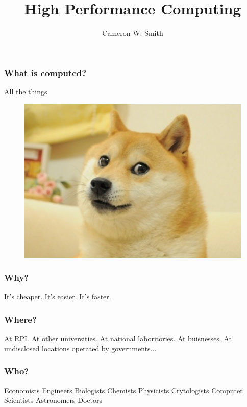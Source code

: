 \documentclass{beamer}
\begin{document}
\title[HPC]
{High Performance Computing}
\author[smithc11@rpi.edu]{Cameron W. Smith}

\begin{frame}[plain]
  \titlepage
\end{frame}

\begin{frame}
  \frametitle{What is computed?}
  \center All the things.
  \begin{figure} \centering
    \includegraphics[width=.8\textwidth]{figs/plainDogeZoom.png}
  \end{figure}
\end{frame}

\begin{frame}
  \frametitle{Why?}
  \center It's cheaper.
  \center It's easier.
  \center It's faster.
\end{frame}

\begin{frame}
  \frametitle{Where?}
  \center At RPI.
  \center At other universities.
  \center At national laboritories.
  \center At buisnesses.
  \center At undisclosed locations operated by governments...
\end{frame}

\begin{frame}
  \frametitle{Who?}
  \center Economists
  \center Engineers
  \center Biologists
  \center Chemists
  \center Physicists
  \center Crytologists
  \center Computer Scientists
  \center Astronomers
  \center Doctors
\end{frame}
\end{document}
